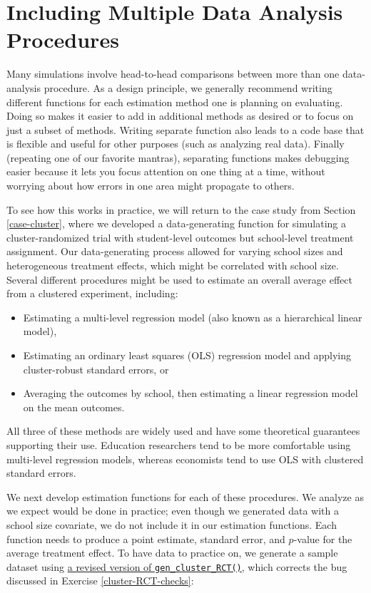 \documentclass[
]{book}
\providecommand{\tightlist}{%
  \setlength{\itemsep}{0pt}\setlength{\parskip}{0pt}}
\begin{document}
\section{Including Multiple Data Analysis Procedures}\label{multiple-estimation-procedures}

Many simulations involve head-to-head comparisons between more than one data-analysis procedure.
As a design principle, we generally recommend writing different functions for each estimation method one is planning on evaluating.
Doing so makes it easier to add in additional methods as desired or to focus on just a subset of methods.
Writing separate function also leads to a code base that is flexible and useful for other purposes (such as analyzing real data).
Finally (repeating one of our favorite mantras), separating functions makes debugging easier because it lets you focus attention on one thing at a time, without worrying about how errors in one area might propagate to others.

To see how this works in practice, we will return to the case study from Section \ref{case-cluster}, where we developed a data-generating function for simulating a cluster-randomized trial with student-level outcomes but school-level treatment assignment.
Our data-generating process allowed for varying school sizes and heterogeneous treatment effects, which might be correlated with school size.
Several different procedures might be used to estimate an overall average effect from a clustered experiment, including:

\begin{itemize}
\tightlist
\item
  Estimating a multi-level regression model (also known as a hierarchical linear model),
\item
  Estimating an ordinary least squares (OLS) regression model and applying cluster-robust standard errors, or
\item
  Averaging the outcomes by school, then estimating a linear regression model on the mean outcomes.
\end{itemize}

All three of these methods are widely used and have some theoretical guarantees supporting their use.
Education researchers tend to be more comfortable using multi-level regression models, whereas economists tend to use OLS with clustered standard errors.

We next develop estimation functions for each of these procedures.
We analyze as we expect would be done in practice; even though we generated data with a school size covariate, we do not include it in our estimation functions.
Each function needs to produce a point estimate, standard error, and \(p\)-value for the average treatment effect.
To have data to practice on, we generate a sample dataset using \href{/case_study_code/gen_cluster_RCT_rev.R}{a revised version of \texttt{gen\_cluster\_RCT()}}, which corrects the bug discussed in Exercise \ref{cluster-RCT-checks}:
\end{document}
